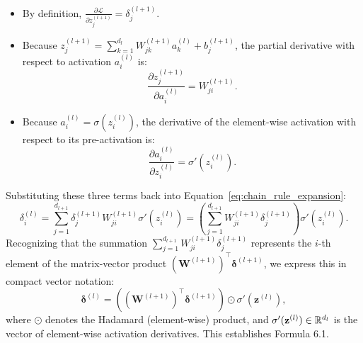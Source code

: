 \begin{itemize}[noitemsep,topsep=2pt,parsep=0pt,partopsep=0pt]
  \item By definition, $\frac{\partial \mathcal{L}}{\partial z_j^{(l+1)}} = \delta_j^{(l+1)}$.
  \item Because $z_j^{(l+1)} = \sum_{k=1}^{d_l} W_{jk}^{(l+1)} a_k^{(l)} + b_j^{(l+1)}$, the partial derivative with respect to activation $a_i^{(l)}$ is:
    \begin{equation}
    \frac{\partial z_j^{(l+1)}}{\partial a_i^{(l)}} = W_{ji}^{(l+1)}.
    \end{equation}
  \item Because $a_i^{(l)} = \sigma(z_i^{(l)})$, the derivative of the element-wise activation with respect to its pre-activation is:
    \begin{equation}
    \frac{\partial a_i^{(l)}}{\partial z_i^{(l)}} = \sigma'(z_i^{(l)}).
    \end{equation}
\end{itemize}
Substituting these three terms back into Equation~\eqref{eq:chain_rule_expansion}:
\begin{equation}
\delta_i^{(l)} = \sum_{j=1}^{d_{l+1}} \delta_j^{(l+1)} W_{ji}^{(l+1)} \sigma'(z_i^{(l)}) = \left( \sum_{j=1}^{d_{l+1}} W_{ji}^{(l+1)} \delta_j^{(l+1)} \right) \sigma'(z_i^{(l)}).
\end{equation}
Recognizing that the summation $\sum_{j=1}^{d_{l+1}} W_{ji}^{(l+1)} \delta_j^{(l+1)}$ represents the $i$-th element of the matrix-vector product $(\mathbf{W}^{(l+1)})^\top \boldsymbol{\delta}^{(l+1)}$, we express this in compact vector notation:
\begin{equation}
\boldsymbol{\delta}^{(l)} = \left( (\mathbf{W}^{(l+1)})^\top \boldsymbol{\delta}^{(l+1)} \right) \odot \sigma'(\mathbf{z}^{(l)}),
\label{eq:recurrence_review}
\end{equation}
where $\odot$ denotes the Hadamard (element-wise) product, and $\sigma'(\mathbf{z}^{(l)}) \in \mathbb{R}^{d_l}$ is the vector of element-wise activation derivatives. This establishes Formula 6.1.


